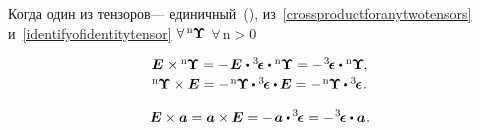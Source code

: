 \begin{otherlanguage}{russian}
\vspace{-0.1em} \noindent Когда один из тензоров\:--- единичный~(), из~\eqref{crossproductforanytwotensors} и~\eqref{identifyofidentitytensor} ${\forall \, {^\mathrm{n}\hspace{-0.12ex}\bm{\Upsilon}}}$ ${\forall \,\mathrm{n \!>\! 0}}$

\nopagebreak\vspace{-0.2em}\begin{equation*}\begin{array}{c}
\bm{E} \hspace{.1ex} \times \hspace{-0.1ex} {^\mathrm{n}\hspace{-0.12ex}\bm{\Upsilon}}
= - \hspace{.2ex} \bm{E} \hspace{.1ex} \dotp \levicivitatensor \dotp {^\mathrm{n}\hspace{-0.12ex}\bm{\Upsilon}}
= - \hspace{.2ex} \levicivitatensor \dotp {^\mathrm{n}\hspace{-0.12ex}\bm{\Upsilon}} \hspace{-0.15ex},
\\[.2em]
%
{^\mathrm{n}\hspace{-0.12ex}\bm{\Upsilon}} \times \bm{E}
= - \hspace{.2ex} {^\mathrm{n}\hspace{-0.12ex}\bm{\Upsilon}} \hspace{-0.1ex} \dotp \levicivitatensor \dotp \hspace{-0.1ex} \bm{E}
= - \hspace{.2ex} {^\mathrm{n}\hspace{-0.12ex}\bm{\Upsilon}} \hspace{-0.1ex} \dotp \levicivitatensor
\hspace{.1ex} .
\end{array}\end{equation*}

\vspace{-0.1em} \noindent {}

\nopagebreak\vspace{-0.2em}\begin{equation}
\bm{E} \times \bm{a} = \bm{a} \times \hspace{-0.1ex} \bm{E} = - \hspace{.25ex} \bm{a} \dotp \hspace{-0.1ex} \levicivitatensor = - \hspace{.2ex} \levicivitatensor \dotp \bm{a} \hspace{.1ex} .
\end{equation}


\end{otherlanguage}
